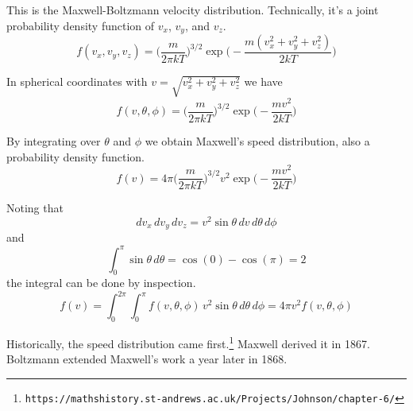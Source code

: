 \documentclass[12pt]{article}
\begin{document}
This is the Maxwell-Boltzmann velocity distribution.
Technically, it's a joint probability density function of $v_x$, $v_y$, and $v_z$.
\begin{equation*}
f(v_x,v_y,v_z)=
\bigg(\frac{m}{2\pi kT}\bigg)^{3/2}
\exp\bigg({-}\frac{m(v_x^2+v_y^2+v_z^2)}{2kT}\bigg)
\end{equation*}

In spherical coordinates with $v=\sqrt{v_x^2+v_y^2+v_z^2}$ we have
\begin{equation*}
f(v,\theta,\phi)=
\bigg(\frac{m}{2\pi kT}\bigg)^{3/2}
\exp\bigg({-}\frac{mv^2}{2kT}\bigg)
\end{equation*}

By integrating over $\theta$ and $\phi$
we obtain Maxwell's speed distribution,
also a probability density function.
\begin{equation*}
f(v)=4\pi\bigg(\frac{m}{2\pi kT}\bigg)^{3/2}
v^2\exp\bigg({-}\frac{mv^2}{2kT}\bigg)
\end{equation*}

Noting that
\begin{equation*}
dv_x\,dv_y\,dv_z=v^2\sin\theta\,dv\,d\theta\,d\phi
\end{equation*}
and
\begin{equation*}
\int_0^\pi\sin\theta\,d\theta=\cos(0)-\cos(\pi)=2
\end{equation*}
the integral can be done by inspection.
\begin{equation*}
f(v)=\int_0^{2\pi}\int_0^\pi f(v,\theta,\phi)\,v^2\sin\theta\,d\theta\,d\phi
=4\pi v^2f(v,\theta,\phi)
\end{equation*}

Historically, the speed distribution came first.\footnote{\tt https://mathshistory.st-andrews.ac.uk/Projects/Johnson/chapter-6/}
Maxwell derived it in 1867.
Boltzmann extended Maxwell's work a year later in 1868.
\end{document}
